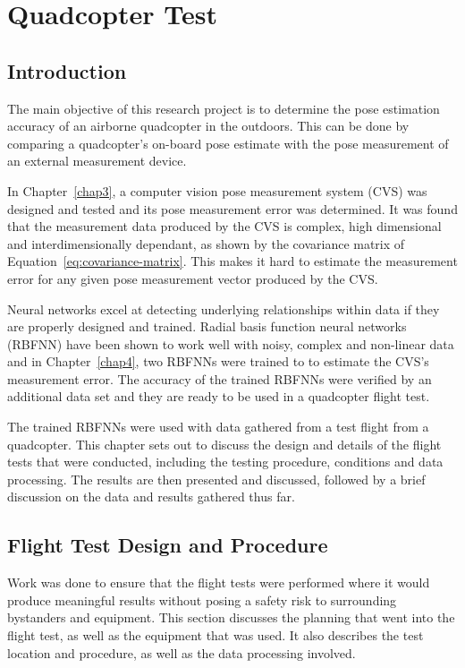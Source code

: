 \chapter{Quadcopter Test}
\label{chap5}

\section{Introduction}

The main objective of this research project is to determine the pose estimation accuracy of an airborne quadcopter in the outdoors. This can be done by comparing a quadcopter's on-board pose estimate with the pose measurement of an external measurement device.  

In Chapter~\ref{chap3}, a computer vision pose measurement system (CVS) was designed and tested and its pose measurement error was determined. It was found that the measurement data produced by the CVS is complex, high dimensional and interdimensionally dependant, as shown by the covariance matrix of Equation~\ref{eq:covariance-matrix}. This makes it hard to estimate the measurement error for any given pose measurement vector produced by the CVS.\@ 

Neural networks excel at detecting underlying relationships within data if they are properly designed and trained. Radial basis function neural networks (RBFNN) have been shown to work well with noisy, complex and non-linear data and in Chapter~\ref{chap4}, two RBFNNs were trained to to estimate the CVS's measurement error. The accuracy of the trained RBFNNs were verified by an additional data set and they are ready to be used in a quadcopter flight test. 

The trained RBFNNs were used with data gathered from a test flight from a quadcopter. This chapter sets out to discuss the design and details of the flight tests that were conducted, including the testing procedure, conditions and data processing. The results are then presented and discussed, followed by a brief discussion on the data and results gathered thus far. 

\section{Flight Test Design and Procedure}

Work was done to ensure that the flight tests were performed where it would produce meaningful results without posing a safety risk to surrounding bystanders and equipment. This section discusses the planning that went into the flight test, as well as the equipment that was used. It also describes the test location and procedure, as well as the data processing involved.  

